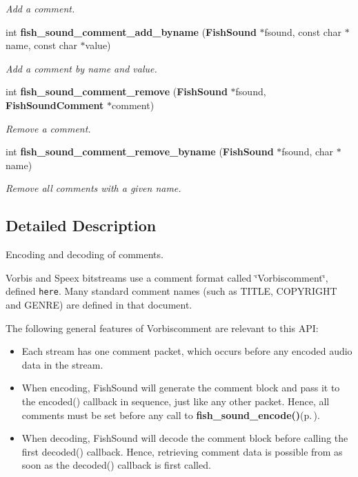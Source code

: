 \begin{CompactItemize}
\begin{CompactList}\small\item\em Add a comment. \item\end{CompactList}\item 
int {\bf fish\_\-sound\_\-comment\_\-add\_\-byname} ({\bf Fish\-Sound} $\ast$fsound, const char $\ast$name, const char $\ast$value)
\begin{CompactList}\small\item\em Add a comment by name and value. \item\end{CompactList}\item 
int {\bf fish\_\-sound\_\-comment\_\-remove} ({\bf Fish\-Sound} $\ast$fsound, {\bf Fish\-Sound\-Comment} $\ast$comment)
\begin{CompactList}\small\item\em Remove a comment. \item\end{CompactList}\item 
int {\bf fish\_\-sound\_\-comment\_\-remove\_\-byname} ({\bf Fish\-Sound} $\ast$fsound, char $\ast$name)
\begin{CompactList}\small\item\em Remove all comments with a given name. \item\end{CompactList}\end{CompactItemize}


\subsection{Detailed Description}
Encoding and decoding of comments. 

Vorbis and Speex bitstreams use a comment format called \char`\"{}Vorbiscomment\char`\"{}, defined {\tt here}. Many standard comment names (such as TITLE, COPYRIGHT and GENRE) are defined in that document.

The following general features of Vorbiscomment are relevant to this API:\begin{itemize}
\item Each stream has one comment packet, which occurs before any encoded audio data in the stream.\item When encoding, Fish\-Sound will generate the comment block and pass it to the encoded() callback in sequence, just like any other packet. Hence, all comments must be set before any call to {\bf fish\_\-sound\_\-encode()}{\rm (p.\,\pageref{fishsound_8h_a8})}.\item When decoding, Fish\-Sound will decode the comment block before calling the first decoded() callback. Hence, retrieving comment data is possible from as soon as the decoded() callback is first called.\end{itemize}


